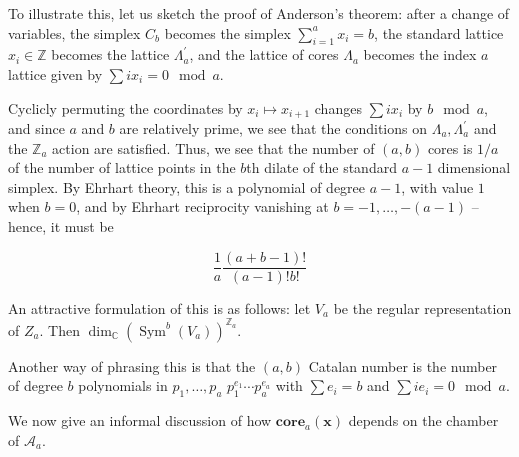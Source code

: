 \documentclass{amsart}[12pt]
\theoremstyle{definition}
\newcommand{\Z}{\mathbb{Z}}
\newcommand{\C}{\mathbb{C}}
\newcommand{\core}{\mathbf{core}}
\DeclareMathOperator{\Sym}{Sym}
\begin{document}




To illustrate this, let us sketch the proof of Anderson's theorem:
after a change of variables, the simplex $C_b$ becomes the simplex
$\sum_{i=1}^a x_i=b$, the standard lattice $x_i\in\Z$ becomes the
lattice $\Lambda^\prime_a$, and the lattice of cores $\Lambda_a$ becomes the index $a$ lattice given by $\sum ix_i=0\mod a$.

Cyclicly permuting the coordinates by $x_i\mapsto x_{i+1}$ changes
$\sum ix_i$ by $b\mod a$, and since $a$ and $b$ are relatively prime,
we see that the conditions on $\Lambda_a, \Lambda^\prime_a$ and the
$\Z_a$ action are satisfied.  Thus, we see that the number of $(a,b)$
cores is $1/a$ of the number of lattice points in the $b$th dilate of
the standard $a-1$ dimensional simplex.  By Ehrhart theory, this is a
polynomial of degree $a-1$, with value $1$ when $b=0$, and by Ehrhart
reciprocity vanishing at $b=-1,\dots, -(a-1)$ -- hence, it must be

$$\frac{1}{a}\frac{(a+b-1)!}{(a-1)!b!}$$

An attractive formulation of this is as follows: let $V_a$ be the
regular representation of $Z_a$.  Then $\dim_\C \left(\Sym^b(V_a)\right)^{\Z_a}.$

Another way of phrasing this is that the $(a,b)$ Catalan number is the number of degree $b$ polynomials in $p_1,\dots, p_a$ $p_1^{e_1}\cdots p_a^{e_a}$ with $\sum e_i=b$ and $\sum i e_i=0\mod a$.

We now give an informal discussion of how $\core_a(\mathbf{x})$ depends on the chamber of $\mathcal{A}_a$.
\end{document}
